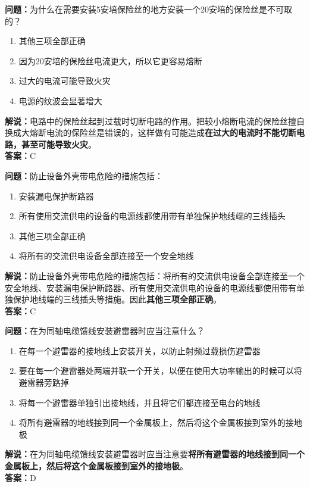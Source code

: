 \documentclass{ctexbook}
\begin{document}
\noindent\textbf{问题：}为什么在需要安装5安培保险丝的地方安装一个20安培的保险丝是不可取的？
\begin{enumerate}[label=\Alph*), leftmargin=3em]
	\item 其他三项全部正确
	\item 因为20安培的保险丝电流更大，所以它更容易熔断
	\item 过大的电流可能导致火灾
	\item 电源的纹波会显著增大
\end{enumerate}
\noindent\textbf{解说：}电路中的保险丝起到过载时切断电路的作用。把较小熔断电流的保险丝擅自换成大熔断电流的保险丝是错误的，这样做有可能造成\textbf{在过大的电流时不能切断电路，甚至可能导致火灾}。\\\noindent\textbf{答案：}C%

\bigskip


\noindent\textbf{问题：}防止设备外壳带电危险的措施包括：
\begin{enumerate}[label=\Alph*), leftmargin=3em]
	\item 安装漏电保护断路器
	\item 所有使用交流供电的设备的电源线都使用带有单独保护地线端的三线插头
	\item 其他三项全部正确
	\item 将所有的交流供电设备全部连接至一个安全地线
\end{enumerate}
\noindent\textbf{解说：}防止设备外壳带电危险的措施包括：将所有的交流供电设备全部连接至一个安全地线、安装漏电保护断路器、所有使用交流供电的设备的电源线都使用带有单独保护地线端的三线插头等措施。因此\textbf{其他三项全部正确}。\\\noindent\textbf{答案：}C

\bigskip


\noindent\textbf{问题：}在为同轴电缆馈线安装避雷器时应当注意什么？
\begin{enumerate}[label=\Alph*), leftmargin=3em]
	\item 在每一个避雷器的接地线上安装开关，以防止射频过载损伤避雷器
	\item 要在每一个避雷器处两端并联一个开关，以便在使用大功率输出的时候可以将避雷器旁路掉
	\item 将每一个避雷器单独引出接地线，并且将它们都连接至电台的地线
	\item 将所有避雷器的地线接到同一个金属板上，然后将这个金属板接到室外的接地极
\end{enumerate}
\noindent\textbf{解说：}在为同轴电缆馈线安装避雷器时应当注意要\textbf{将所有避雷器的地线接到同一个金属板上，然后将这个金属板接到室外的接地极}。\\\noindent\textbf{答案：}D
\end{document}
